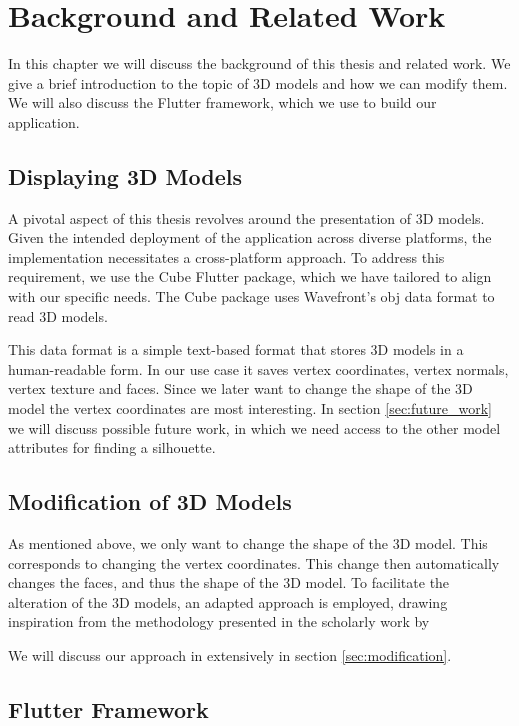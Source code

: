 \setcounter{chapter}{1}

\chapter{Background and Related Work}\label{ch02-related-work}

In this chapter we will discuss the background of this thesis and related work. We give a brief introduction to the topic of 3D models and how we can modify them. We will also discuss the Flutter framework, which we use to build our application.


\section{Displaying 3D Models}

A pivotal aspect of this thesis revolves around the presentation of 3D models. Given the intended deployment of the application across diverse platforms, the implementation necessitates a cross-platform approach. 
To address this requirement, we use the Cube Flutter package, which we have tailored to align with our specific needs. The Cube package uses Wavefront's obj data format to read 3D models.

This data format is a simple text-based format that stores 3D models in a human-readable form. In our use case it saves vertex coordinates, vertex normals, vertex texture and faces. Since we later want to change
the shape of the 3D model the vertex coordinates are most interesting.
In section \ref{sec:future_work} we will discuss possible future work, in which we need access to the other model attributes for finding a silhouette.


\section{Modification of 3D Models}
As mentioned above, we only want to change the shape of the 3D model. This corresponds to changing the vertex coordinates. This change then automatically changes the faces, and thus the shape of the 3D model.
To facilitate the alteration of the 3D models, an adapted approach is employed, drawing inspiration from the methodology presented in the scholarly work by \cite{rychlik2008applications}

We will discuss our approach in extensively in section \ref{sec:modification}.

\section{Flutter Framework}

